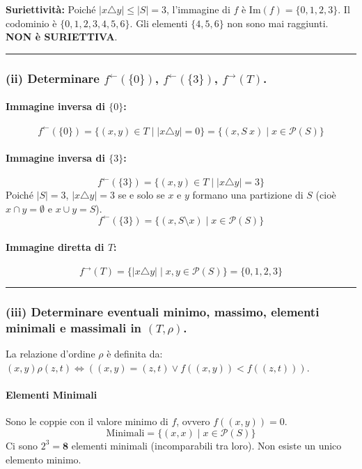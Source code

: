 \textbf{Suriettività:}
Poiché $|x \triangle y| \le |S| = 3$, l'immagine di $f$ è $\text{Im}(f) = \{0, 1, 2, 3\}$.
Il codominio è $\{0, 1, 2, 3, 4, 5, 6\}$. Gli elementi $\{4, 5, 6\}$ non sono mai raggiunti.
\textbf{NON è SURIETTIVA}.

\vspace{0.3cm}
\hrule
\vspace{0.3cm}

\subsubsection*{(ii) Determinare $f^{\leftarrow}(\{0\})$, $f^{\leftarrow}(\{3\})$, $f^{\rightarrow}(T)$.}

\paragraph*{Immagine inversa di $\{0\}$:}
$$ f^{\leftarrow}(\{0\}) = \{(x, y) \in T \mid |x \triangle y| = 0\} = \{(x, S \ x) \mid x \in \mathcal{P}(S)\} $$

\paragraph*{Immagine inversa di $\{3\}$:}
$$ f^{\leftarrow}(\{3\}) = \{(x, y) \in T \mid |x \triangle y| = 3\} $$
Poiché $|S|=3$, $|x \triangle y| = 3$ se e solo se $x$ e $y$ formano una partizione di $S$ (cioè $x \cap y = \emptyset$ e $x \cup y = S$).
$$ f^{\leftarrow}(\{3\}) = \{(x, S \setminus x) \mid x \in \mathcal{P}(S)\} $$

\paragraph*{Immagine diretta di $T$:}
$$ f^{\rightarrow}(T) = \{|x \triangle y| \mid x, y \in \mathcal{P}(S)\} = \{0, 1, 2, 3\} $$

\vspace{0.3cm}
\hrule
\vspace{0.3cm}

\subsubsection*{(iii) Determinare eventuali minimo, massimo, elementi minimali e massimali in $(T, \rho)$.}

La relazione d'ordine $\rho$ è definita da: $(x, y) \rho (z, t) \iff ((x, y) = (z, t) \lor f((x, y)) < f((z, t)))$.

\paragraph*{Elementi Minimali}
Sono le coppie con il valore minimo di $f$, ovvero $f((x, y)) = 0$.
$$ \text{Minimali} = \{(x, x) \mid x \in \mathcal{P}(S)\} $$
Ci sono $2^3 = \mathbf{8}$ elementi minimali (incomparabili tra loro). Non esiste un unico elemento minimo.

